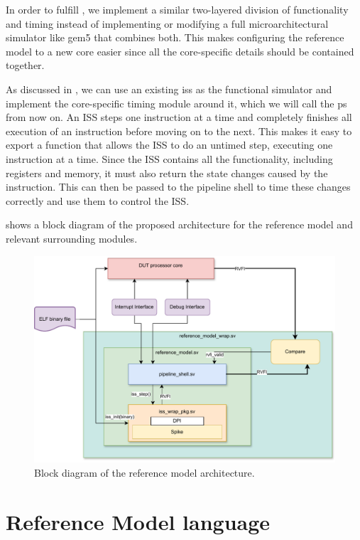 In order to fulfill , we implement a similar two-layered division of functionality and timing instead of implementing or modifying a full microarchitectural simulator like gem5 \cite{Gem5Simulator2023} that combines both. This makes configuring the reference model to a new core easier since all the core-specific details should be contained together. 

As discussed in , we can use an existing \acrshort{iss} as the functional simulator and implement the core-specific timing module around it, which we will call the \gls{ps} from now on. An ISS steps one instruction at a time and completely finishes all execution of an instruction before moving on to the next. This makes it easy to export a  function that allows the ISS to do an untimed step, executing one instruction at a time. Since the ISS contains all the functionality, including registers and memory, it must also return the state changes caused by the instruction. This can then be passed to the pipeline shell to time these changes correctly and use them to control the ISS.


 shows a block diagram of the proposed architecture for the reference model and relevant surrounding modules.




\begin{figure}
    \centering
    \includegraphics[width=0.75\linewidth]{figures/Architecture.pdf}
    \caption{Block diagram of the reference model architecture.}
    \label{fig:architecture}
\end{figure}

\section{Reference Model language}

